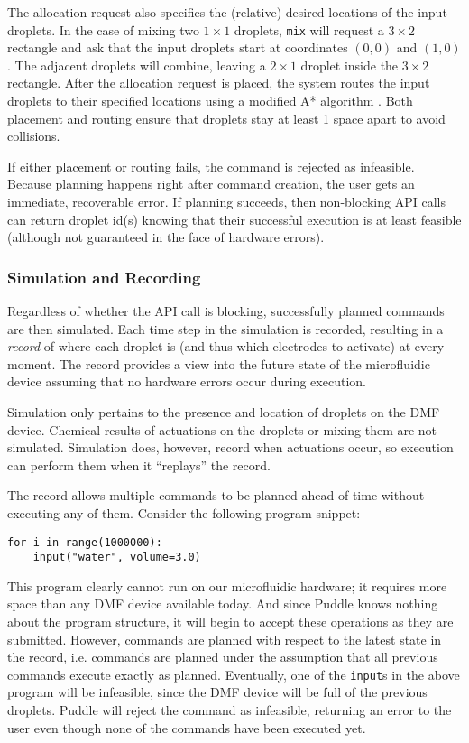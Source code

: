 \documentclass{jpaper}
\newcommand\philip[1]{\todo[color=orange!40]{\sf #1}}
\begin{document}
The allocation request also specifies the (relative) desired locations of the input droplets.
In the case of mixing two $1 \times 1$ droplets, \lstinline{mix} will request a $3 \times 2$ rectangle and ask that the input droplets start at coordinates $(0,0)$ and $(1,0)$.
The adjacent droplets will combine, leaving a $2 \times 1$ droplet inside the $3 \times 2$ rectangle.
After the allocation request is placed, the system routes the input droplets to their specified locations using a modified A* algorithm \cite{a-star, bohringer2006parallel}.
Both placement and routing ensure that droplets stay at least 1 space apart to avoid collisions.

If either placement or routing fails, the command is rejected as infeasible.
Because planning happens right after command creation, the user gets an immediate, recoverable error.
If planning succeeds, then non-blocking API calls can return droplet id(s) knowing that their successful execution is at least feasible (although not guaranteed in the face of hardware errors).

\subsubsection{Simulation and Recording}
\label{sec:simulation}

Regardless of whether the API call is blocking, successfully planned commands are then simulated.
Each time step in the simulation is recorded, resulting in a \emph{record} of where each droplet is (and thus which electrodes to activate) at every moment.
The record provides a view into the future state of the microfluidic device assuming that no hardware errors occur during execution.

Simulation only pertains to the presence and location of droplets on the DMF device.
Chemical results of actuations on the droplets or mixing them are not simulated.
Simulation does, however, record when actuations occur, so execution can perform them when it ``replays'' the record.

The record allows multiple commands to be planned ahead-of-time without executing any of them.
Consider the following program snippet:

\begin{lstlisting}[numbers=none, xleftmargin=15mm]
for i in range(1000000):
    input("water", volume=3.0)
\end{lstlisting}

This program clearly cannot run on our microfluidic hardware; it requires more space than any DMF device available today.
And since Puddle knows nothing about the program structure, it will begin to accept these operations as they are submitted.
However, commands are planned with respect to the latest state in the record, i.e. commands are planned under the assumption that all previous commands execute exactly as planned.
Eventually, one of the \lstinline{input}s in the above program will be infeasible, since the DMF device will be full of the previous droplets.
Puddle will reject the command as infeasible, returning an error to the user even though none of the commands have been executed yet.
\philip{how much is simulated at one time?}
\end{document}
